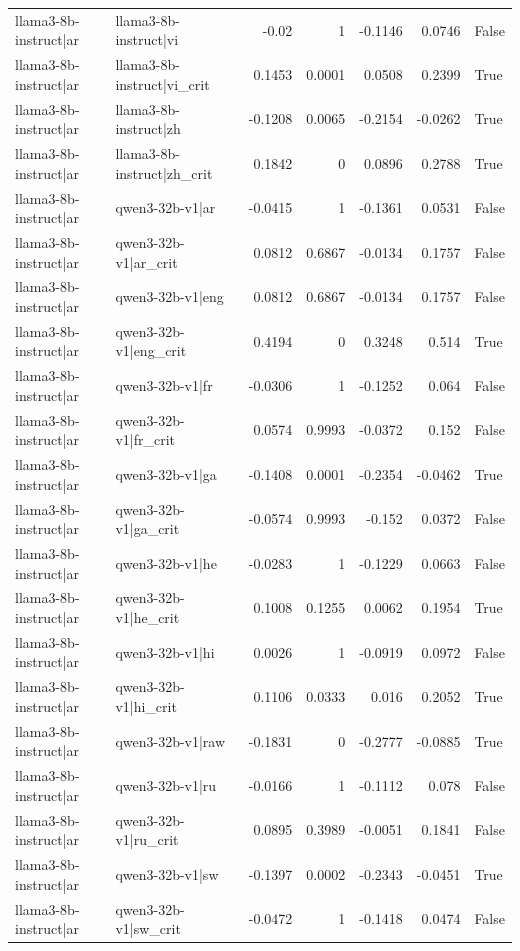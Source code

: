 \begin{table}
\begin{tabular}{l l r r r r l}
llama3-8b-instruct|ar & llama3-8b-instruct|vi & -0.02 & 1 & -0.1146 & 0.0746 & False \\
llama3-8b-instruct|ar & llama3-8b-instruct|vi_crit & 0.1453 & 0.0001 & 0.0508 & 0.2399 & True \\
llama3-8b-instruct|ar & llama3-8b-instruct|zh & -0.1208 & 0.0065 & -0.2154 & -0.0262 & True \\
llama3-8b-instruct|ar & llama3-8b-instruct|zh_crit & 0.1842 & 0 & 0.0896 & 0.2788 & True \\
llama3-8b-instruct|ar & qwen3-32b-v1|ar & -0.0415 & 1 & -0.1361 & 0.0531 & False \\
llama3-8b-instruct|ar & qwen3-32b-v1|ar_crit & 0.0812 & 0.6867 & -0.0134 & 0.1757 & False \\
llama3-8b-instruct|ar & qwen3-32b-v1|eng & 0.0812 & 0.6867 & -0.0134 & 0.1757 & False \\
llama3-8b-instruct|ar & qwen3-32b-v1|eng_crit & 0.4194 & 0 & 0.3248 & 0.514 & True \\
llama3-8b-instruct|ar & qwen3-32b-v1|fr & -0.0306 & 1 & -0.1252 & 0.064 & False \\
llama3-8b-instruct|ar & qwen3-32b-v1|fr_crit & 0.0574 & 0.9993 & -0.0372 & 0.152 & False \\
llama3-8b-instruct|ar & qwen3-32b-v1|ga & -0.1408 & 0.0001 & -0.2354 & -0.0462 & True \\
llama3-8b-instruct|ar & qwen3-32b-v1|ga_crit & -0.0574 & 0.9993 & -0.152 & 0.0372 & False \\
llama3-8b-instruct|ar & qwen3-32b-v1|he & -0.0283 & 1 & -0.1229 & 0.0663 & False \\
llama3-8b-instruct|ar & qwen3-32b-v1|he_crit & 0.1008 & 0.1255 & 0.0062 & 0.1954 & True \\
llama3-8b-instruct|ar & qwen3-32b-v1|hi & 0.0026 & 1 & -0.0919 & 0.0972 & False \\
llama3-8b-instruct|ar & qwen3-32b-v1|hi_crit & 0.1106 & 0.0333 & 0.016 & 0.2052 & True \\
llama3-8b-instruct|ar & qwen3-32b-v1|raw & -0.1831 & 0 & -0.2777 & -0.0885 & True \\
llama3-8b-instruct|ar & qwen3-32b-v1|ru & -0.0166 & 1 & -0.1112 & 0.078 & False \\
llama3-8b-instruct|ar & qwen3-32b-v1|ru_crit & 0.0895 & 0.3989 & -0.0051 & 0.1841 & False \\
llama3-8b-instruct|ar & qwen3-32b-v1|sw & -0.1397 & 0.0002 & -0.2343 & -0.0451 & True \\
llama3-8b-instruct|ar & qwen3-32b-v1|sw_crit & -0.0472 & 1 & -0.1418 & 0.0474 & False \\

\end{tabular}
\end{table}
